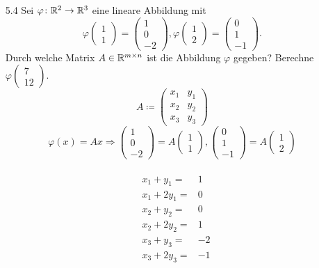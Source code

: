 \documentclass{HM}
\begin{document}
\begin{enumerate}
\begin{enumerate}
\\
\end{enumerate}
\item [5.4] Sei $\varphi\colon\mathbb{R}^2\to\mathbb{R}^3$ eine lineare Abbildung mit
$$\varphi\begin{pmatrix}
1\\
1
\end{pmatrix}=\begin{pmatrix}
1\\
0\\
-2
\end{pmatrix},
\varphi\begin{pmatrix}
1\\
2
\end{pmatrix}=\begin{pmatrix}
0\\
1\\
-1
\end{pmatrix}.$$
Durch welche Matrix $A\in\mathbb{R}^{m\times n}$ ist die Abbildung $\varphi$ gegeben? Berechne $\varphi\begin{pmatrix}
7\\
12
\end{pmatrix}$.\\
$$A\coloneqq\begin{pmatrix}
x_1&y_1\\
x_2&y_2\\
x_3&y_3
\end{pmatrix}$$
$$\varphi(x)=Ax
\Rightarrow \begin{pmatrix}
1\\
0\\
-2
\end{pmatrix}=A\begin{pmatrix}
1\\
1
\end{pmatrix},
\begin{pmatrix}
0\\
1\\
-1
\end{pmatrix}=A\begin{pmatrix}
1\\
2
\end{pmatrix}$$\\
\begin{align*}
&x_1+y_1=&1\\
&x_1+2y_1=&0\\
&x_2+y_2=&0\\
&x_2+2y_2=&1\\
&x_3+y_3=&-2\\
&x_3+2y_3=&-1\\

\end{align*}
\end{enumerate}
\end{document}
